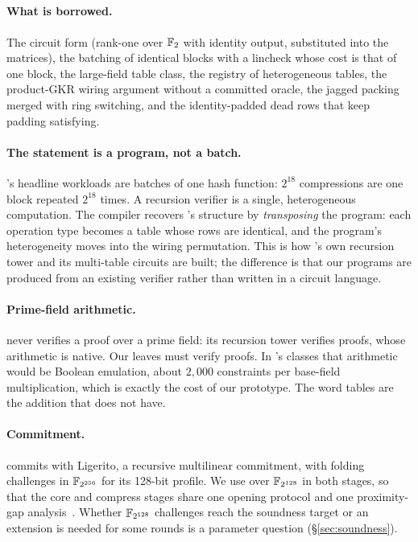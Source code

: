\subsection{\Flock{}}

\paragraph{What is borrowed.} The circuit form (rank-one over $\mathbb{F}_{2}$ with identity output, \XOR{} substituted into the matrices), the batching of identical blocks with a lincheck whose cost is that of one block, the large-field table class, the registry of heterogeneous tables, the product-GKR wiring argument without a committed oracle, the jagged packing merged with ring switching, and the identity-padded dead rows that keep padding satisfying.

\paragraph{The statement is a program, not a batch.} \Flock{}'s headline workloads are batches of one hash function: $2^{18}$ \Blake{} compressions are one block repeated $2^{18}$ times. A recursion verifier is a single, heterogeneous computation. The compiler recovers \Flock{}'s structure by \emph{transposing} the program: each operation type becomes a table whose rows are identical, and the program's heterogeneity moves into the wiring permutation. This is how \Flock{}'s own recursion tower and its multi-table circuits are built; the difference is that our programs are produced from an existing verifier rather than written in a circuit language.

\paragraph{Prime-field arithmetic.} \Flock{} never verifies a proof over a prime field: its recursion tower verifies \Flock{} proofs, whose arithmetic is native. Our leaves must verify \KB{} proofs. In \Flock{}'s classes that arithmetic would be Boolean emulation, about $2{,}000$ \AND{} constraints per base-field multiplication, which is exactly the cost of our prototype. The word tables are the addition that \Flock{} does not have.

\paragraph{Commitment.} \Flock{} commits with Ligerito, a recursive multilinear commitment, with folding challenges in $\mathbb{F}_{2^{256}}$ for its 128-bit profile. We use \WHIR{} over $\mathbb{F}_{2^{128}}$ in both stages, so that the core and compress stages share one opening protocol and one proximity-gap analysis~\citep{proximity-gaps,proximity-gaps-2025}. Whether $\mathbb{F}_{2^{128}}$ challenges reach the soundness target or an extension is needed for some rounds is a parameter question (\S\ref{sec:soundness}).

